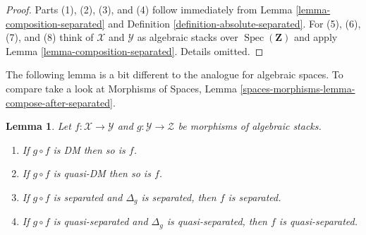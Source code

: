 \documentclass{stacks-project}
\theoremstyle{plain}
\newtheorem{lemma}[subsection]{Lemma}
\theoremstyle{definition}
\theoremstyle{remark}
\numberwithin{equation}{subsection}
\def\Spec{\mathop{\mathrm{Spec}}}
\begin{document}
\begin{proof}
Parts (1), (2), (3), and (4) follow immediately from
Lemma \ref{lemma-composition-separated}
and
Definition \ref{definition-absolute-separated}.
For (5), (6), (7), and (8) think of $\mathcal{X}$ and $\mathcal{Y}$ as
algebraic stacks over $\Spec(\mathbf{Z})$ and apply
Lemma \ref{lemma-composition-separated}.
Details omitted.
\end{proof}

\noindent
The following lemma is a bit different to the analogue for algebraic
spaces. To compare take a look at
Morphisms of Spaces,
Lemma \ref{spaces-morphisms-lemma-compose-after-separated}.

\begin{lemma}
\label{lemma-compose-after-separated}
Let $f : \mathcal{X} \to \mathcal{Y}$ and
$g : \mathcal{Y} \to \mathcal{Z}$ be morphisms of algebraic stacks.
\begin{enumerate}
\item If $g \circ f$ is DM then so is $f$.
\item If $g \circ f$ is quasi-DM then so is $f$.
\item If $g \circ f$ is separated and $\Delta_g$ is separated, then
$f$ is separated.
\item If $g \circ f$ is quasi-separated and
$\Delta_g$ is quasi-separated, then $f$ is quasi-separated.
\end{enumerate}
\end{lemma}
\end{document}
